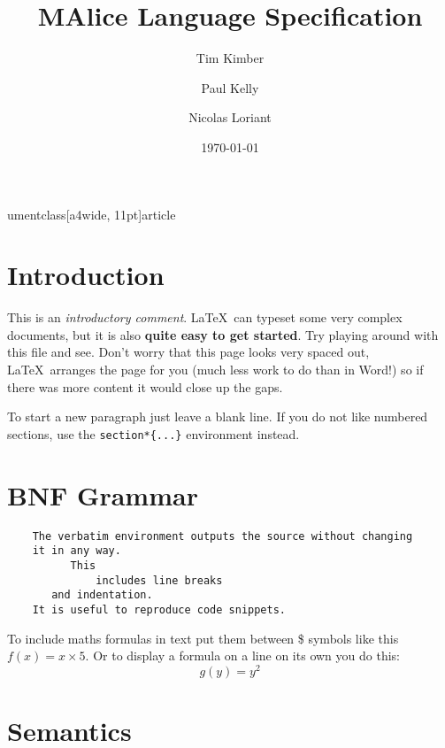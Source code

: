umentclass[a4wide, 11pt]{article}
\usepackage{a4, fullpage}
\setlength{\parskip}{0.3cm}
\setlength{\parindent}{0cm}




\title{MAlice Language Specification}

\author{Tim Kimber \and Paul Kelly \and Nicolas Loriant}

\date{\today}         %

\maketitle            %

\section{Introduction}

This is an \emph{introductory comment}.
\LaTeX\ can typeset some very complex documents, but it is also
\textbf{quite easy to get started}.
Try playing around with this file and see. 
Don't worry that this page looks very spaced out,
\LaTeX\ arranges the page for you (much less work to do than in Word!)
so if there was more content it would close up the gaps.

To start a new paragraph just leave a blank line.
If you do not like numbered sections, use the \texttt{section*\{...\}}
environment instead.

\section{BNF Grammar} 

\begin{verbatim}
    The verbatim environment outputs the source without changing
    it in any way. 
          This
              includes line breaks
       and indentation. 
    It is useful to reproduce code snippets.
\end{verbatim}

To include maths formulas in text put them between \$ symbols like this
$f(x) = x \times 5$.
Or to display a formula on a line on its own you do this:
\[
    g(y) = y^2
\]

\section{Semantics}

